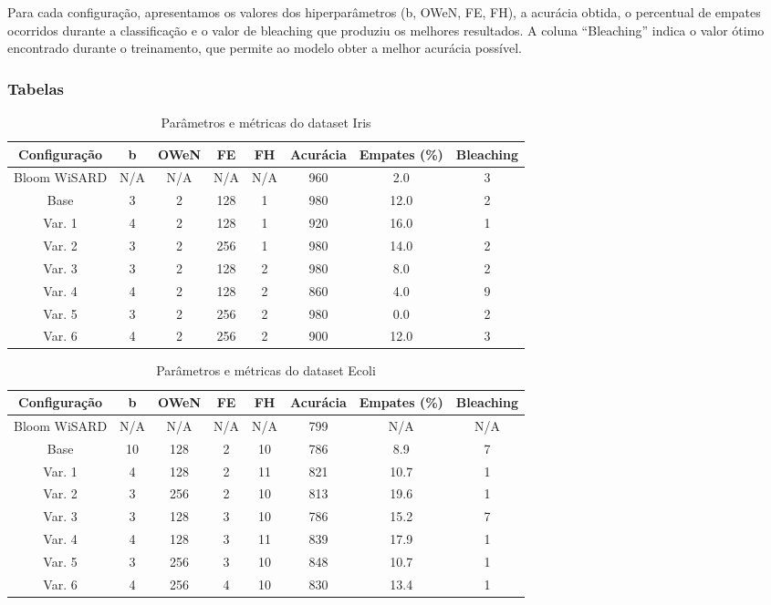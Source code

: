 \documentclass{article}
\begin{document}
Para cada configuração, apresentamos os valores dos hiperparâmetros (b, OWeN, FE, FH), a acurácia obtida, o percentual de empates ocorridos durante a classificação e o valor de bleaching que produziu os melhores resultados. A coluna ``Bleaching'' indica o valor ótimo encontrado durante o treinamento, que permite ao modelo obter a melhor acurácia possível.

\subsubsection{Tabelas}

{\small
\begin{table}[H]
\caption{Parâmetros e métricas do dataset Iris}
\begin{tabular}{|c|c|c|c|c|c|c|c|}
\hline
\textbf{Configuração} & \textbf{b} & \textbf{OWeN} & \textbf{FE} & \textbf{FH} & \textbf{Acurácia} & \textbf{Empates (\%)} & \textbf{Bleaching} \\
\hline
Bloom WiSARD & N/A & N/A & N/A & N/A & 960 & 2.0 & 3 \\
\hline
Base & 3 & 2 & 128 & 1 & 980 & 12.0 & 2 \\
\hline
Var. 1 & 4 & 2 & 128 & 1 & 920 & 16.0 & 1 \\
\hline
Var. 2 & 3 & 2 & 256 & 1 & 980 & 14.0 & 2 \\
\hline
Var. 3 & 3 & 2 & 128 & 2 & 980 & 8.0 & 2 \\
\hline
Var. 4 & 4 & 2 & 128 & 2 & 860 & 4.0 & 9 \\
\hline
Var. 5 & 3 & 2 & 256 & 2 & 980 & 0.0 & 2 \\
\hline
Var. 6 & 4 & 2 & 256 & 2 & 900 & 12.0 & 3 \\
\hline
\end{tabular}
\end{table}

\begin{table}[H]
\caption{Parâmetros e métricas do dataset Ecoli}
\begin{tabular}{|c|c|c|c|c|c|c|c|}
\hline
\textbf{Configuração} & \textbf{b} & \textbf{OWeN} & \textbf{FE} & \textbf{FH} & \textbf{Acurácia} & \textbf{Empates (\%)} & \textbf{Bleaching} \\
\hline
Bloom WiSARD & N/A & N/A & N/A & N/A & 799 & N/A & N/A \\
\hline
Base & 10 & 128 & 2 & 10 & 786 & 8.9 & 7 \\
\hline
Var. 1 & 4 & 128 & 2 & 11 & 821 & 10.7 & 1 \\
\hline
Var. 2 & 3 & 256 & 2 & 10 & 813 & 19.6 & 1 \\
\hline
Var. 3 & 3 & 128 & 3 & 10 & 786 & 15.2 & 7 \\
\hline
Var. 4 & 4 & 128 & 3 & 11 & 839 & 17.9 & 1 \\
\hline
Var. 5 & 3 & 256 & 3 & 10 & 848 & 10.7 & 1 \\
\hline
Var. 6 & 4 & 256 & 4 & 10 & 830 & 13.4 & 1 \\
\hline
\end{tabular}
\end{table}

}
\end{document}
